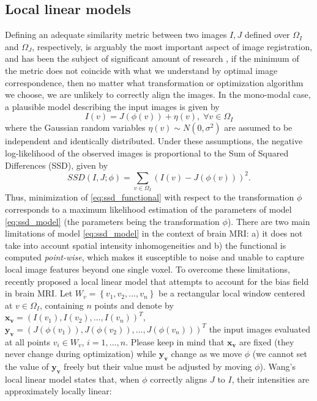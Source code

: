 \subsection{Local linear models}
Defining an adequate similarity metric between two images $I, J$ defined over $\Omega_{I}$ and $\Omega_{J}$, respectively, is arguably the most important aspect of image registration, and has been the subject of significant amount of research \citep{Sotiras2013}, if the minimum of the metric does not coincide with what we understand by optimal image correspondence, then no matter what transformation or optimization algorithm we choose, we are unlikely to correctly align the images. In the mono-modal case, a plausible model describing the input images is given by
\begin{equation}\label{eq:ssd_model}
    I(v) = J(\phi(v)) + \eta(v), \; \forall v\in\Omega_{I}
\end{equation}
where the Gaussian random variables $\eta(v) \sim N(0, \sigma^{2})$ are assumed to be independent and identically distributed. Under these assumptions, the negative log-likelihood of the observed images is proportional to the Sum of Squared Differences (SSD), given by
\begin{equation}\label{eq:ssd_functional}
    SSD(I, J; \phi) = \sum_{v \in \Omega_{I}} \left(I(v) - J(\phi(v))\right)^{2}.
\end{equation}
Thus, minimization of \eqref{eq:ssd_functional} with respect to the transformation $\phi$ corresponds to a maximum likelihood estimation of the parameters of model \eqref{eq:ssd_model} (the parameters being the transformation $\phi$). There are two main limitations of model \eqref{eq:ssd_model} in the context of brain MRI: a) it does not take into account spatial intensity inhomogeneities and b) the functional is computed \emph{point-wise}, which makes it susceptible to noise and unable to capture local image features beyond one single voxel. To overcome these limitations, \cite{Wang2014} recently proposed a local linear model that attempts to account for the bias field in brain MRI. Let $W_{v} = \left\lbrace v_{1}, v_{2}, ..., v_{n} \right\rbrace$ be a rectangular local window centered at $v\in\Omega_{I}$, containing $n$ points and denote by $\mathbf{x_{v}} = (I(v_{1}), I(v_{2}), ..., I(v_{n}))^{T}$, $\mathbf{y_{v}} = (J(\phi(v_{1})), J(\phi(v_{2})), ..., J(\phi(v_{n})))^{T}$ the input images evaluated at all points $v_{i}\in W_{v}$, $i=1, ..., n$. Please keep in mind that $\mathbf{x_{v}}$ are fixed (they never change during optimization) while $\mathbf{y_{v}}$ change as we move $\phi$ (we cannot set the value of $\mathbf{y_{v}}$ freely but their value must be adjusted by moving $\phi$). Wang's local linear model states that, when $\phi$ correctly aligns $J$ to $I$, their intensities are approximately locally linear:
